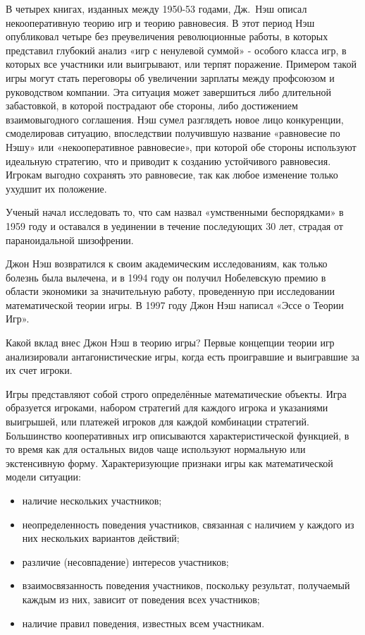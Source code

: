 \documentclass[14pt, a4paper]{extarticle}
\begin{document}
В четырех книгах, изданных между 1950-53 годами\cite{jn50a,jn50c,jn51,jn53},
Дж.~Нэш описал некооперативную теорию игр и теорию равновесия. В этот период
Нэш опубликовал четыре без преувеличения революционные работы, в которых
представил глубокий анализ «игр с ненулевой суммой» - особого класса игр, в
которых все участники или выигрывают, или терпят поражение. Примером такой игры
могут стать переговоры об увеличении зарплаты между профсоюзом и руководством
компании.  Эта ситуация может завершиться либо длительной забастовкой, в
которой пострадают обе стороны, либо достижением взаимовыгодного соглашения.
Нэш сумел разглядеть новое лицо конкуренции, смоделировав ситуацию,
впоследствии получившую название «равновесие по Нэшу» или «некооперативное
равновесие», при которой обе стороны используют идеальную стратегию, что и
приводит к созданию устойчивого равновесия. Игрокам выгодно сохранять это
равновесие, так как любое изменение только ухудшит их положение\cite{vm03}.

Ученый начал исследовать то, что сам назвал «умственными беспорядками» в
1959 году и оставался в уединении в течение последующих 30 лет, страдая от
параноидальной шизофрении.

Джон Нэш возвратился к своим академическим исследованиям, как только болезнь
была вылечена, и в 1994 году он получил Нобелевскую премию в области экономики
за значительную работу, проведенную при исследовании математической теории
игры. В 1997 году Джон Нэш написал «Эссе о Теории Игр».

Какой вклад внес Джон Нэш в теорию игры?
Первые концепции теории игр анализировали антагонистические игры, когда
есть проигравшие и выигравшие за их счет игроки.

Игры представляют собой строго определённые математические объекты. Игра
образуется игроками, набором стратегий для каждого игрока и указаниями
выигрышей, или платежей игроков для каждой комбинации стратегий. Большинство
кооперативных игр описываются характеристической функцией, в то время как
для остальных видов чаще используют нормальную или экстенсивную форму.
Характеризующие признаки игры как математической модели ситуации:
\begin{itemize}
\item наличие нескольких участников;

\item неопределенность поведения участников, связанная с наличием у каждого
    из них нескольких вариантов действий;

\item различие (несовпадение) интересов участников;

\item взаимосвязанность поведения участников, поскольку результат, получаемый
    каждым из них, зависит от поведения всех участников;

\item наличие правил поведения, известных всем участникам.
\end{itemize}
\end{document}
